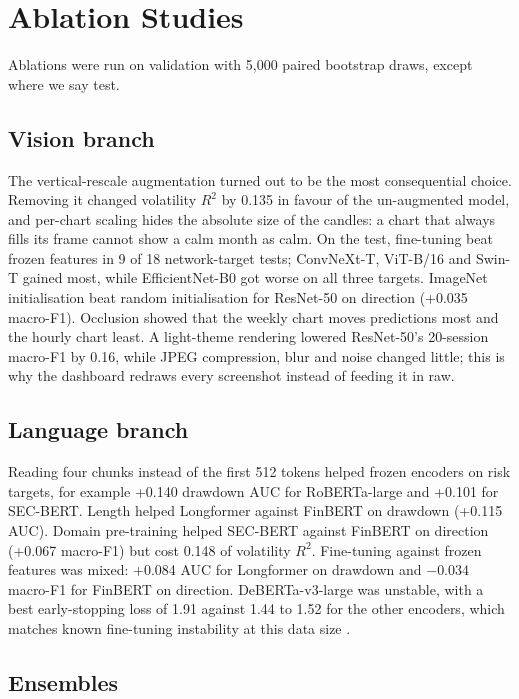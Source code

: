 \documentclass[conference]{IEEEtran}
\begin{document}
\section{Ablation Studies}

Ablations were run on validation with 5,000 paired bootstrap draws, except where we say test.

\subsection{Vision branch}

The vertical-rescale augmentation turned out to be the most consequential choice. Removing it changed volatility $R^2$ by 0.135 in favour of the un-augmented model, and per-chart scaling hides the absolute size of the candles: a chart that always fills its frame cannot show a calm month as calm. On the test, fine-tuning beat frozen features in 9 of 18 network-target tests; ConvNeXt-T, ViT-B/16 and Swin-T gained most, while EfficientNet-B0 got worse on all three targets. ImageNet initialisation beat random initialisation for ResNet-50 on direction (+0.035 macro-F1). Occlusion showed that the weekly chart moves predictions most and the hourly chart least. A light-theme rendering lowered ResNet-50's 20-session macro-F1 by 0.16, while JPEG compression, blur and noise changed little; this is why the dashboard redraws every screenshot instead of feeding it in raw.

\subsection{Language branch}

Reading four chunks instead of the first 512 tokens helped frozen encoders on risk targets, for example +0.140 drawdown AUC for RoBERTa-large and +0.101 for SEC-BERT. Length helped Longformer against FinBERT on drawdown (+0.115 AUC). Domain pre-training helped SEC-BERT against FinBERT on direction (+0.067 macro-F1) but cost 0.148 of volatility $R^2$. Fine-tuning against frozen features was mixed: +0.084 AUC for Longformer on drawdown and $-0.034$ macro-F1 for FinBERT on direction. DeBERTa-v3-large was unstable, with a best early-stopping loss of 1.91 against 1.44 to 1.52 for the other encoders, which matches known fine-tuning instability at this data size \cite{dodge2020,mosbach2021}.

\subsection{Ensembles}
\end{document}
